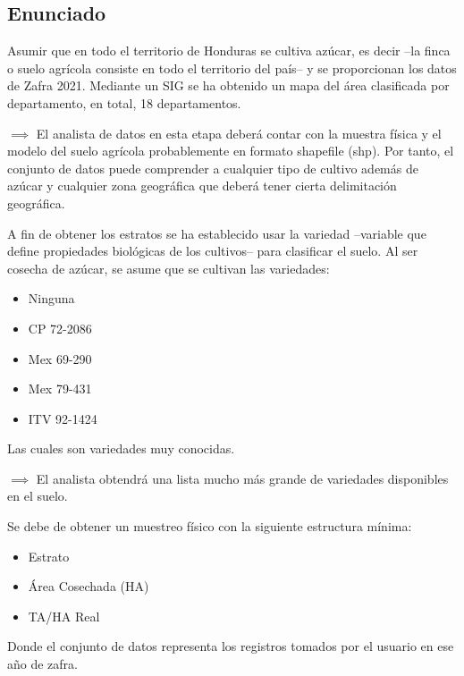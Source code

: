 \documentclass[conference]{IEEEtran}
\begin{document}
\subsection{Enunciado}

Asumir que en todo el territorio de Honduras se cultiva azúcar, es decir --la finca o suelo agrícola consiste en todo el territorio del país-- y se proporcionan los datos de Zafra 2021. Mediante un SIG se ha obtenido un mapa del área clasificada por departamento, en total, 18 departamentos.

\bigbreak

$\implies$ El analista de datos en esta etapa deberá contar con la muestra física y el modelo del suelo agrícola probablemente en formato shapefile (shp). Por tanto, el conjunto de datos puede comprender a cualquier tipo de  cultivo además de azúcar y cualquier zona geográfica que deberá tener
cierta delimitación geográfica.

\bigbreak

A fin de obtener los estratos se ha establecido usar la variedad --variable que define propiedades biológicas de los cultivos-- para clasificar el suelo. Al ser cosecha de azúcar, se asume que se cultivan las variedades:

\begin{itemize}
    \item Ninguna
    \item CP 72-2086
    \item Mex 69-290
    \item Mex 79-431
    \item ITV 92-1424
\end{itemize}

Las cuales son variedades muy conocidas.

\bigbreak

$\implies$ El analista obtendrá una lista mucho más grande de variedades disponibles en el suelo.

\bigbreak

Se debe de obtener un muestreo físico con la siguiente estructura mínima:

\begin{itemize}
    \item Estrato
    \item Área Cosechada (HA)
    \item TA/HA Real
\end{itemize}

Donde el conjunto de datos representa los registros tomados por el usuario en ese año de zafra.
\end{document}
